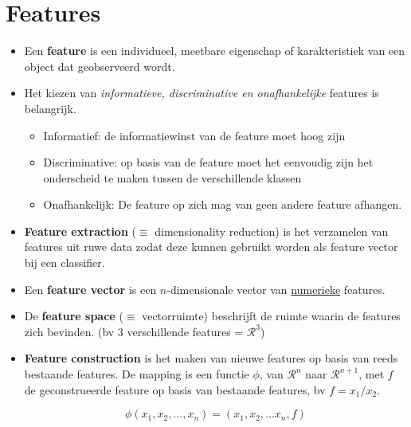 \section{Features}
\begin{itemize}
	\item Een \textbf{feature} is een individueel, meetbare eigenschap of karakteristiek van een object dat geobserveerd wordt.
	\item Het kiezen van \textit{informatieve, discriminative en onafhankelijke} features is belangrijk.
	\begin{itemize}
		\item Informatief: de informatiewinst van de feature moet hoog zijn
		\item Discriminative: op basis van de feature moet het eenvoudig zijn het onderscheid te maken tussen de verschillende klassen
		\item Onafhankelijk: De feature op zich mag van geen andere feature afhangen.
	\end{itemize}
	\item \textbf{Feature extraction} ($\equiv$ dimensionality reduction) is het verzamelen van features uit ruwe data zodat deze kunnen gebruikt worden als feature vector bij een classifier. 
	\item Een \textbf{feature vector} is een $n$-dimensionale vector van \underline{numerieke} features.
	\item De \textbf{feature space} ($\equiv$ vectorruimte) beschrijft de ruimte waarin de features zich bevinden. (bv 3 verschillende features = $\mathcal{R}^3$)
	\item \textbf{Feature construction} is het maken van nieuwe features op basis van reeds bestaande features. De mapping is een functie $\phi$, van $\mathcal{R}^n$ naar $\mathcal{R}^{n + 1}$, met $f$ de geconstrueerde feature op basis van bestaande features, bv $f = x_1/x_2$.
	
	$$\phi(x_1, x_2, ..., x_n) = (x_1, x_2, ... x_n, f)$$

\end{itemize}
